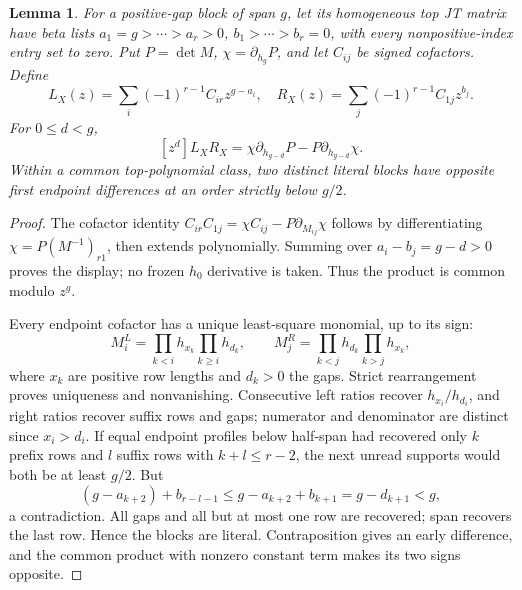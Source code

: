 \documentclass[11pt,a4paper]{amsart}
\numberwithin{equation}{section}
\theoremstyle{plain}
\newtheorem{lemma}[theorem]{Lemma}
\theoremstyle{definition}
\begin{document}
\begin{lemma}\label{lem:positive-endpoints}
For a positive-gap block of span \(g\), let its homogeneous top JT matrix have beta lists \(a_1=g>\cdots>a_r>0\), \(b_1>\cdots>b_r=0\), with every nonpositive-index entry set to zero.  Put \(P=\det M\), \(\chi=\partial_{h_g}P\), and let \(C_{ij}\) be signed cofactors.  Define
\[
 L_X(z)=\sum_i(-1)^{r-1}C_{ir}z^{g-a_i},\quad
 R_X(z)=\sum_j(-1)^{r-1}C_{1j}z^{b_j}.
\]
For \(0\le d<g\),
\[
 [z^d]L_XR_X=\chi\partial_{h_{g-d}}P-P\partial_{h_{g-d}}\chi.
\]
Within a common top-polynomial class, two distinct literal blocks have opposite first endpoint differences at an order strictly below \(g/2\).
\end{lemma}
\begin{proof}
The cofactor identity
\(C_{ir}C_{1j}=\chi C_{ij}-P\partial_{M_{ij}}\chi\)
follows by differentiating \(\chi=P(M^{-1})_{r1}\), then extends polynomially.  Summing over \(a_i-b_j=g-d>0\) proves the display; no frozen \(h_0\) derivative is taken.  Thus the product is common modulo \(z^g\).

Every endpoint cofactor has a unique least-square monomial, up to its sign:
\[
 M_i^L=\prod_{k<i}h_{x_k}\prod_{k\ge i}h_{d_k},\qquad
 M_j^R=\prod_{k<j}h_{d_k}\prod_{k>j}h_{x_k},
\]
where \(x_k\) are positive row lengths and \(d_k>0\) the gaps.  Strict rearrangement proves uniqueness and nonvanishing.  Consecutive left ratios recover \(h_{x_i}/h_{d_i}\), and right ratios recover suffix rows and gaps; numerator and denominator are distinct since \(x_i>d_i\).  If equal endpoint profiles below half-span had recovered only \(k\) prefix rows and \(l\) suffix rows with \(k+l\le r-2\), the next unread supports would both be at least \(g/2\).  But
\[
 (g-a_{k+2})+b_{r-l-1}\le g-a_{k+2}+b_{k+1}=g-d_{k+1}<g,
\]
a contradiction.  All gaps and all but at most one row are recovered; span recovers the last row.  Hence the blocks are literal.  Contraposition gives an early difference, and the common product with nonzero constant term makes its two signs opposite.
\end{proof}
\end{document}
